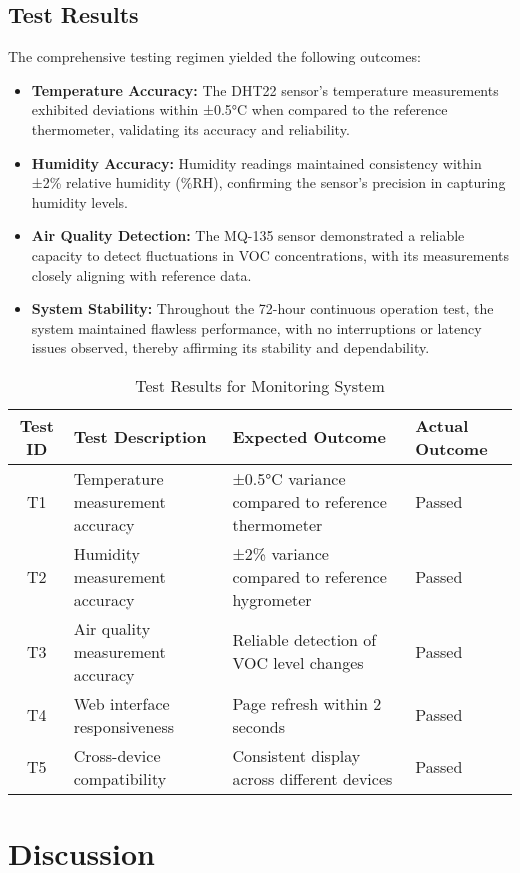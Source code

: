 \documentclass[a4paper, 12pt]{report}
\begin{document}
\subsection{Test Results}
The comprehensive testing regimen yielded the following outcomes:
\begin{itemize}
    \item \textbf{Temperature Accuracy:} The DHT22 sensor's temperature measurements exhibited deviations within ±0.5°C when compared to the reference thermometer, validating its accuracy and reliability.
    \item \textbf{Humidity Accuracy:} Humidity readings maintained consistency within ±2\% relative humidity (\%RH), confirming the sensor's precision in capturing humidity levels.
    \item \textbf{Air Quality Detection:} The MQ-135 sensor demonstrated a reliable capacity to detect fluctuations in VOC concentrations, with its measurements closely aligning with reference data.
    \item \textbf{System Stability:} Throughout the 72-hour continuous operation test, the system maintained flawless performance, with no interruptions or latency issues observed, thereby affirming its stability and dependability.
\end{itemize}

\begin{table}[H]
\centering
\begin{tabular}{|c|p{4cm}|p{4cm}|p{4cm}|}
\hline
\textbf{Test ID} & \textbf{Test Description} & \textbf{Expected Outcome} & \textbf{Actual Outcome} \\ \hline
T1 & Temperature measurement accuracy & ±0.5°C variance compared to reference thermometer & Passed \\ \hline
T2 & Humidity measurement accuracy & ±2\% variance compared to reference hygrometer & Passed \\ \hline
T3 & Air quality measurement accuracy & Reliable detection of VOC level changes & Passed \\ \hline
T4 & Web interface responsiveness & Page refresh within 2 seconds & Passed \\ \hline
T5 & Cross-device compatibility & Consistent display across different devices & Passed \\ \hline
\end{tabular}
\caption{Test Results for Monitoring System}
\label{tab:testing_results}
\end{table}

\section{Discussion}
\end{document}
